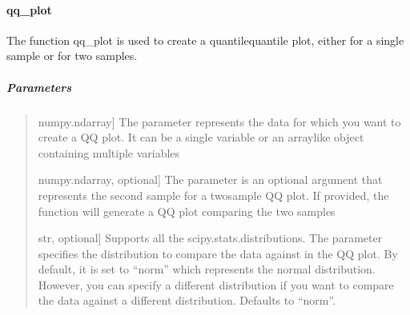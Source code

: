 \documentclass[letterpaper,10pt,english,openany,oneside]{sphinxmanual}
\begin{document}
{{{{\sphinxstepscope


\paragraph{qq\_plot}
\label{\detokenize{api_reference/generated/QuadratiK.tools.qq_plot:qq-plot}}\label{\detokenize{api_reference/generated/QuadratiK.tools.qq_plot::doc}}

\begin{fulllineitems}
\label{\detokenize{api_reference/generated/QuadratiK.tools.qq_plot:QuadratiK.tools.qq_plot}}
\pysigstartsignatures
{}
\pysigstopsignatures
\sphinxAtStartPar
The function qq\_plot is used to create a quantile\sphinxhyphen{}quantile plot,
either for a single sample or for two samples.


\subparagraph{Parameters}
\label{\detokenize{api_reference/generated/QuadratiK.tools.qq_plot:parameters}}\begin{quote}
\begin{description}
\sphinxlineitem{x}{[}numpy.ndarray{]}
\sphinxAtStartPar
The  parameter represents the data for which you want to
create a QQ plot. It can be a single variable or an array\sphinxhyphen{}like
object containing multiple variables

\sphinxlineitem{y}{[}numpy.ndarray, optional{]}
\sphinxAtStartPar
The parameter  is an optional argument that represents the second
sample for a two\sphinxhyphen{}sample QQ plot. If provided, the function will generate
a QQ plot comparing the two samples

\sphinxlineitem{dist}{[}str, optional{]}
\sphinxAtStartPar
Supports all the scipy.stats.distributions. The  parameter specifies
the distribution to compare the data against in the QQ plot. By default,
it is set to “norm” which represents the normal distribution. However, you can
specify a different distribution if you want to compare the data against
a different distribution. Defaults to “norm”.

\end{description}
\end{quote}



\end{fulllineitems}}}}}
\end{document}

